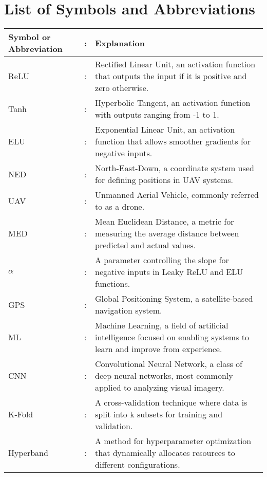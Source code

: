 \chapter*{List of Symbols and Abbreviations}

\renewcommand{\arraystretch}{1.2} %
\setlength{\tabcolsep}{4pt} %
\small %
\begin{tabular}{@{}p{3cm}p{0.5cm}p{10cm}@{}}
    \textbf{Symbol or Abbreviation} & : & \textbf{Explanation} \\ \hline
    ReLU & : & Rectified Linear Unit, an activation function that outputs the input if it is positive and zero otherwise. \\
    Tanh & : & Hyperbolic Tangent, an activation function with outputs ranging from -1 to 1. \\
    ELU & : & Exponential Linear Unit, an activation function that allows smoother gradients for negative inputs. \\
    NED & : & North-East-Down, a coordinate system used for defining positions in UAV systems. \\
    UAV & : & Unmanned Aerial Vehicle, commonly referred to as a drone. \\
    MED & : & Mean Euclidean Distance, a metric for measuring the average distance between predicted and actual values. \\
    $\alpha$ & : & A parameter controlling the slope for negative inputs in Leaky ReLU and ELU functions. \\
    GPS & : & Global Positioning System, a satellite-based navigation system. \\
    ML & : & Machine Learning, a field of artificial intelligence focused on enabling systems to learn and improve from experience. \\
    CNN & : & Convolutional Neural Network, a class of deep neural networks, most commonly applied to analyzing visual imagery. \\
    K-Fold & : & A cross-validation technique where data is split into k subsets for training and validation. \\
    Hyperband & : & A method for hyperparameter optimization that dynamically allocates resources to different configurations. \\
\end{tabular}

\clearpage
